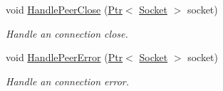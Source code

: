 \begin{DoxyCompactItemize}
void \hyperlink{classns3_1_1PacketSink_ae897d6540d02dbbfc1283fefe6bb9748}{Handle\+Peer\+Close} (\hyperlink{classns3_1_1Ptr}{Ptr}$<$ \hyperlink{classns3_1_1Socket}{Socket} $>$ socket)
\begin{DoxyCompactList}\small\item\em Handle an connection close. \end{DoxyCompactList}\item 
void \hyperlink{classns3_1_1PacketSink_a892849e8ad986f4ef44dfd29fb6b9445}{Handle\+Peer\+Error} (\hyperlink{classns3_1_1Ptr}{Ptr}$<$ \hyperlink{classns3_1_1Socket}{Socket} $>$ socket)
\begin{DoxyCompactList}\small\item\em Handle an connection error. \end{DoxyCompactList}\end{DoxyCompactItemize}
